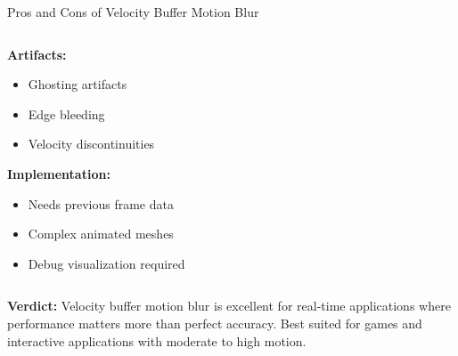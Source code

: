 \documentclass[aspectratio=169]{beamer}
\begin{document}
\begin{frame}{Pros and Cons of Velocity Buffer Motion Blur}
\begin{columns}[t]
\begin{column}{0.48\textwidth}
{{                \textbf{Artifacts:}
                \begin{itemize}
                    \item Ghosting artifacts
                    \item Edge bleeding
                    \item Velocity discontinuities
                \end{itemize}
                
                \textbf{Implementation:}
                \begin{itemize}
                    \item Needs previous frame data
                    \item Complex animated meshes
                    \item Debug visualization required
                \end{itemize}
            }}
        \end{column}
    \end{columns}
    
    \vspace{0.4cm}
    \begin{center}
        \colorbox{blue!10}{\parbox{0.9\textwidth}{
            \centering
            \textbf{Verdict:} Velocity buffer motion blur is excellent for real-time applications 
            where performance matters more than perfect accuracy. Best suited for games and 
            interactive applications with moderate to high motion.
        }}
    \end{center}
\end{frame}
\end{document}

